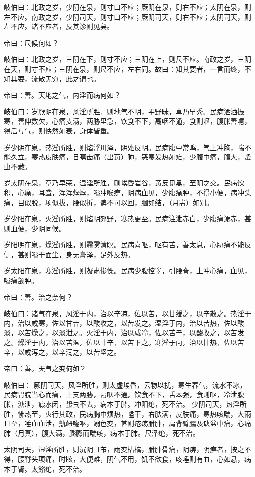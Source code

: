 \documentclass{article}%
\begin{document}
岐伯曰：北政之岁，少阴在泉，则寸口不应；厥阴在泉，则右不应；太阴在泉，则左不应。南政之岁，少阴司天，则寸口不应；厥阴司天，则右不应；太阴司天，则左不应。诸不应者，反其诊则见矣。

帝曰：尺候何如？

岐伯曰：北政之岁，三阴在下，则寸不应；三阴在上，则尺不应。南政之岁，三阴在天，则寸不应；三阴在泉，则尺不应，左右同。故曰：知其要者，一言而终，不知其要，流散无穷，此之谓也。

帝曰：善。天地之气，内淫而病何如？

岐伯曰：岁厥阴在泉，风淫所胜，则地气不明，平野昧，草乃早秀。民病洒洒振寒，善伸数欠，心痛支满，两胁里急，饮食不下，鬲咽不通，食则呕，腹胀善噫，得后与气，则快然如衰，身体皆重。

岁少阴在泉，热淫所胜，则焰浮川泽，阴处反明。民病腹中常鸣，气上冲胸，喘不能久立，寒热皮肤痛，目瞑齿痛（出页）肿，恶寒发热如疟，少腹中痛，腹大，蛰虫不藏。

岁太阴在泉，草乃早荣，湿淫所胜，则埃昏岩谷，黄反见黑，至阴之交。民病饮积，心痛，耳聋，浑浑焞焞，嗌肿喉痹，阴病血见，少腹痛肿，不得小便，病冲头痛，目似脱，项似拔，腰似折，髀不可以回，膕如结，（月耑）如别。

岁少阳在泉，火淫所胜，则焰明郊野，寒热更至。民病注泄赤白，少腹痛溺赤，甚则血便，少阴同候。

岁阳明在泉，燥淫所胜，则霿雾清瞑。民病喜呕，呕有苦，善太息，心胁痛不能反侧，甚则嗌干面尘，身无膏泽，足外反热。

岁太阳在泉，寒淫所胜，则凝肃惨慄。民病少腹控睾，引腰脊，上冲心痛，血见，嗌痛颔肿。

帝曰：善。治之奈何？

岐伯曰：诸气在泉，风淫于内，治以辛凉，佐以苦，以甘缓之，以辛散之。热淫于内，治以咸寒，佐以甘苦，以酸收之，以苦发之。湿淫于内，治以苦热，佐以酸淡，以苦燥之，以淡泄之。火淫于内，治以咸冷，佐以苦辛，以酸收之，以苦发之。燥淫于内，治以苦温，佐以甘辛，以苦下之。寒淫于内，治以甘热，佐以苦辛，以咸泻之，以辛润之，以苦坚之。

帝曰：善。天气之变何如？

岐伯曰： 厥阴司天，风淫所胜，则太虚埃昏，云物以扰，寒生春气，流水不冰，民病胃脘当心而痛，上支两胁，鬲咽不通，饮食不下，舌本强，食则呕，冷泄腹胀，溏泄，瘕水闭，蛰虫不去，病本于脾。冲阳绝，死不治。 少阴司天，热淫所胜，怫热至，火行其政，民病胸中烦热，嗌干，右胠满，皮肤痛，寒热咳喘，大雨且至，唾血血泄，鼽衄嚏呕，溺色变，甚则疮疡胕肿，肩背臂臑及缺盆中痛，心痛肺（月真），腹大满，膨膨而喘咳，病本于肺。尺泽绝，死不治。

太阴司天，湿淫所胜，则沉阴且布，雨变枯槁，胕肿骨痛，阴痹，阴痹者，按之不得，腰脊头项痛，时眩，大便难，阴气不用，饥不欲食，咳唾则有血，心如悬，病本于肾。太谿绝，死不治。
\end{document}

